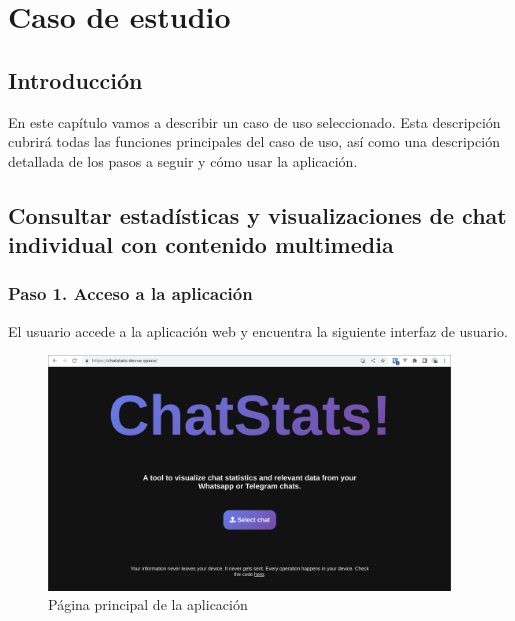 \chapter{Caso de estudio}
\label{chap:case-study}

\section{Introducción}
\label{sec:5:introduction}

En este capítulo vamos a describir un caso de uso seleccionado. Esta descripción cubrirá todas las funciones principales del caso de uso, así como una descripción detallada de los pasos a seguir y cómo usar la aplicación.

\section{Consultar estadísticas y visualizaciones de chat individual con contenido multimedia}



\subsection{Paso 1. Acceso a la aplicación}

El usuario accede a la aplicación web y encuentra la siguiente interfaz de usuario.

\begin{figure}[H]
	\centering
	\includegraphics[width=0.95\textwidth]{img/study_case/step1.png}
	\caption{Página principal de la aplicación}
	\label{fig:chap5:step_1}
\end{figure}

